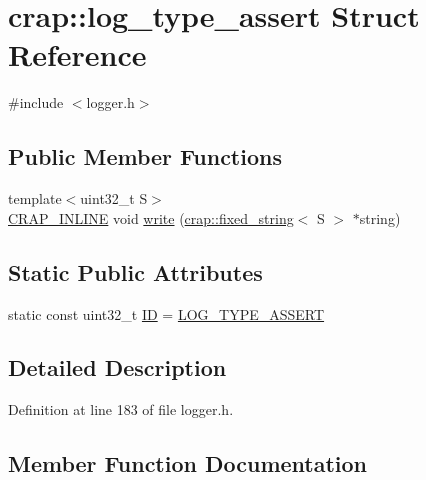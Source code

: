 \hypertarget{structcrap_1_1log__type__assert}{}\section{crap\+:\+:log\+\_\+type\+\_\+assert Struct Reference}
\label{structcrap_1_1log__type__assert}


{\ttfamily \#include $<$logger.\+h$>$}

\subsection*{Public Member Functions}
\begin{DoxyCompactItemize}
\item 
{\footnotesize template$<$uint32\+\_\+t S$>$ }\\\hyperlink{config__x86_8h_a5a40526b8d842e7ff731509998bb0f1c}{C\+R\+A\+P\+\_\+\+I\+N\+L\+I\+N\+E} void \hyperlink{structcrap_1_1log__type__assert_aca4ccaa24ce56a132349b8752e40f1a9}{write} (\hyperlink{classcrap_1_1fixed__string}{crap\+::fixed\+\_\+string}$<$ S $>$ $\ast$string)
\end{DoxyCompactItemize}
\subsection*{Static Public Attributes}
\begin{DoxyCompactItemize}
\item 
static const uint32\+\_\+t \hyperlink{structcrap_1_1log__type__assert_a8c6abe2c41e9c5a1880d3ce2b317f637}{I\+D} = \hyperlink{logger_8h_a7471e00da55fd22f4789aa4989c4a482}{L\+O\+G\+\_\+\+T\+Y\+P\+E\+\_\+\+A\+S\+S\+E\+R\+T}
\end{DoxyCompactItemize}


\subsection{Detailed Description}


Definition at line 183 of file logger.\+h.



\subsection{Member Function Documentation}
\hypertarget{structcrap_1_1log__type__assert_aca4ccaa24ce56a132349b8752e40f1a9}{}
